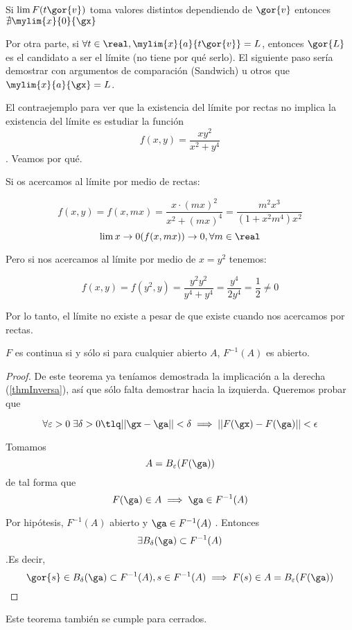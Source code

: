 \documentclass{apuntes}
\begin{document}
 Si $\displaystyle\lim F({t\gor{v}})$ toma valores distintos dependiendo de $\gor{v}$ entonces $\nexists \displaystyle\mylim{x}{0}{\gx}$
 
Por otra parte, si $\forall t \in \real, \mylim{x}{a}{t\gor{v}} = L$, entonces $\gor{L}$ es el candidato a ser el límite (no tiene por qué serlo). El siguiente paso sería demostrar con argumentos de comparación (Sandwich) u otros que $\mylim{x}{a}{\gx} = L$.
 
 El contraejemplo para ver que la existencia del límite por rectas no implica la existencia del límite es estudiar la función \[ f(x,y) = \frac{x y^2}{x^2 + y^4}\] . Veamos por qué.
 
 Si os acercamos al límite por medio de rectas:

 \[ f(x,y) = f(x,mx) = \frac{x\cdot(mx)^2}{x^2 + (mx)^4} = \frac{m^2x^3}{(1 + x^2m^4)x^2} \]
 \[ \lim{x\to 0} (f(x,mx)) \rightarrow 0, \forall m \in \real \]

 Pero si nos acercamos al límite por medio de $x = y^2$ tenemos:

\[ f(x,y) = f(y^2,y) = \frac{y^2y^2}{y^4+y^4} = \frac{y^4}{2y^4} = \frac{1}{2} ≠ 0\]  

Por lo tanto, el límite no existe a pesar de que existe cuando nos acercamos por rectas.
 
 
\begin{theorem}
 $F$ es continua si y sólo si para cualquier abierto $A$, $F^{-1}(A)$ es abierto.
\end{theorem}

\begin{proof}
De este teorema ya teníamos demostrada la implicación a la derecha (\ref{thmInversa}), así que sólo falta demostrar hacia la izquierda. Queremos probar que

\[ \forall \varepsilon > 0\; \exists \delta>0 \tlq ||\gx-\ga||<\delta \implies ||F(\gx)-F(\ga)||<\epsilon \]

Tomamos  \[ A = B_{\varepsilon}(F(\ga))\] de tal forma que \[ F(\ga) \in A \implies \ga \in F^{-1}(A) \]

Por hipótesis, $F^{-1}(A)$ abierto y $\ga \in F^{-1}(A)$ . Entonces 
\[\exists B_{\delta}(\ga) \subset F^{-1}(A) \].Es decir, \[ \gor{s}\in B_{\delta}(\ga) \subset F^{-1}(A), s\in F^{-1}(A) \implies F(s) \in A = B_{\varepsilon}(F(\ga))\]
\end{proof}

\begin{remark}
Este teorema también se cumple para cerrados.
\end{remark}
\end{document}
